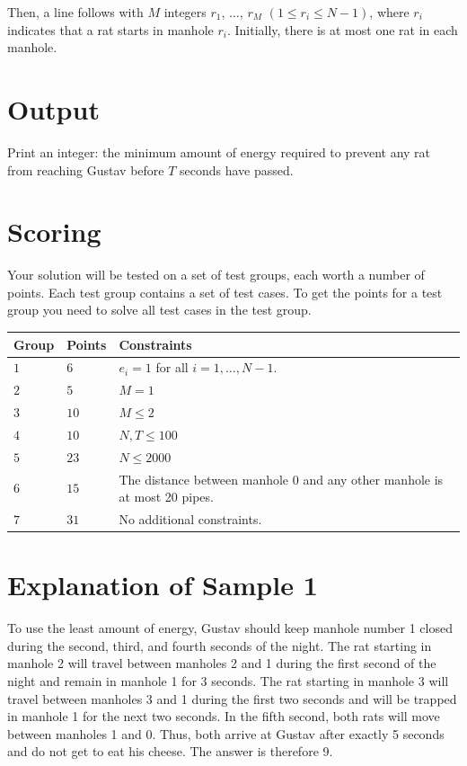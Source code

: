 Then, a line follows with $M$ integers $r_1$, $\dots$, $r_M$ $(1 \leq r_i \leq N-1)$, where $r_i$ indicates that a
rat starts in manhole $r_i$. Initially, there is at most one rat in each manhole.

\section*{Output}
Print an integer: the minimum amount of energy required to prevent any rat from reaching Gustav before
$T$ seconds have passed.

\section*{Scoring}
Your solution will be tested on a set of test groups, each worth a number of points. Each test group contains
a set of test cases. To get the points for a test group you need to solve all test cases in the test group.

\noindent
\begin{tabular}{| l | l | p{12cm} |}
  \hline
  \textbf{Group} & \textbf{Points} & \textbf{Constraints} \\ \hline
  $1$ & $6$ & $e_i = 1$ for all $i = 1, \dots, N-1$. \\ \hline
  $2$ & $5$ & $M = 1$ \\ \hline
  $3$ & $10$ & $M \leq 2$ \\ \hline
  $4$ & $10$ & $N, T \leq 100$ \\ \hline
  $5$ & $23$ & $N \leq 2000$ \\ \hline
  $6$ & $15$ & The distance between manhole $0$ and any other manhole is at most 20 pipes. \\ \hline
  $7$ & $31$ & No additional constraints. \\ \hline
\end{tabular}

\section*{Explanation of Sample 1}

To use the least amount of energy, Gustav should keep manhole number 1 closed during the second, third,
and fourth seconds of the night. The rat starting in manhole 2 will travel between manholes 2 and 1 during the first
second of the night and remain in manhole 1 for 3 seconds.
The rat starting in manhole 3 will travel between manholes 3 and 1 during the first two seconds and will be trapped
in manhole 1 for the next two seconds.
In the fifth second, both rats will move between manholes 1 and 0.
Thus, both arrive at Gustav after exactly 5 seconds and do not get to eat his cheese.
The answer is therefore 9.

